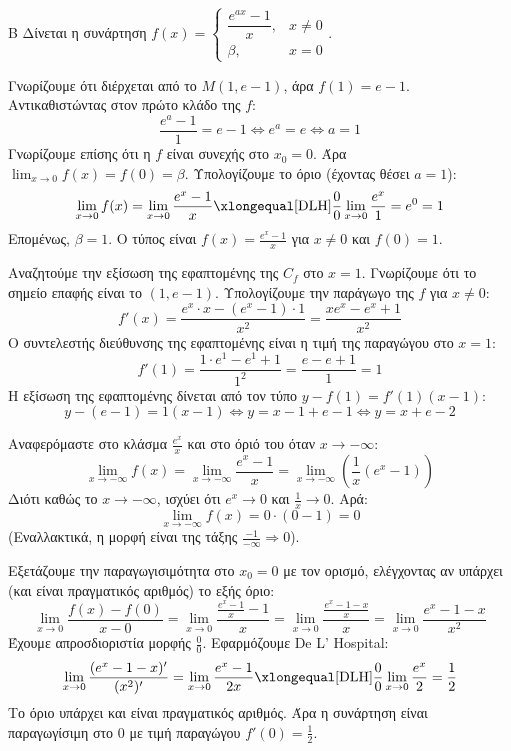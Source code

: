 \begin{thema}{Β}
Δίνεται η συνάρτηση $f(x) = \begin{cases} \dfrac{e^{ax}-1}{x}, & x \ne 0 \\ \beta, & x=0 \end{cases}$.
\begin{erwthma}
\item Γνωρίζουμε ότι διέρχεται από το $M(1, e-1)$, άρα $f(1) = e-1$. Αντικαθιστώντας στον πρώτο κλάδο της $f$:
\[ \frac{e^a - 1}{1} = e - 1 \Leftrightarrow e^a = e \Leftrightarrow a = 1 \]
Γνωρίζουμε επίσης ότι η $f$ είναι συνεχής στο $x_0 = 0$. Άρα $\lim_{x\to0} f(x) = f(0) = \beta$. 
Υπολογίζουμε το όριο (έχοντας θέσει $a=1$):
\[ \lim_{x\to0} f(x) = \lim_{x\to0} \frac{e^x - 1}{x} \xlongequal[\text{DLH}]{\frac{0}{0}} \lim_{x\to0} \frac{e^x}{1} = e^0 = 1 \]
Επομένως, $\beta = 1$. Ο τύπος είναι $f(x) = \frac{e^x-1}{x}$ για $x \ne 0$ και $f(0)=1$.

\item Αναζητούμε την εξίσωση της εφαπτομένης της $C_f$ στο $x=1$. 
Γνωρίζουμε ότι το σημείο επαφής είναι το $(1, e-1)$.
Υπολογίζουμε την παράγωγο της $f$ για $x \ne 0$:
\[ f'(x) = \frac{e^x \cdot x - (e^x-1) \cdot 1}{x^2} = \frac{xe^x - e^x + 1}{x^2} \]
Ο συντελεστής διεύθυνσης της εφαπτομένης είναι η τιμή της παραγώγου στο $x=1$:
\[ f'(1) = \frac{1\cdot e^1 - e^1 + 1}{1^2} = \frac{e - e + 1}{1} = 1 \]
Η εξίσωση της εφαπτομένης δίνεται από τον τύπο $y - f(1) = f'(1)(x - 1)$:
\[ y - (e-1) = 1(x - 1) \Leftrightarrow y = x - 1 + e - 1 \Leftrightarrow y = x + e - 2 \]

\item Αναφερόμαστε στο κλάσμα $\frac{e^x}{x}$ και στο όριό του όταν $x \to -\infty$:
\[ \lim_{x\to-\infty} f(x) = \lim_{x\to-\infty} \frac{e^x - 1}{x} = \lim_{x\to-\infty} \left( \frac{1}{x} (e^x - 1) \right) \]
Διότι καθώς το $x \to -\infty$, ισχύει ότι $e^x \to 0$ και $\frac{1}{x} \to 0$. Αρά:
\[ \lim_{x\to-\infty} f(x) = 0 \cdot (0 - 1) = 0 \]
(Εναλλακτικά, η μορφή είναι της τάξης $\frac{-1}{-\infty} \Rightarrow 0$).

\item Εξετάζουμε την παραγωγισιμότητα στο $x_0=0$ με τον ορισμό, ελέγχοντας αν υπάρχει (και είναι πραγματικός αριθμός) το εξής όριο:
\[ \lim_{x\to0} \frac{f(x) - f(0)}{x - 0} = \lim_{x\to0} \frac{\frac{e^x-1}{x} - 1}{x} = \lim_{x\to0} \frac{\frac{e^x-1-x}{x}}{x} = \lim_{x\to0} \frac{e^x-1-x}{x^2} \]
Έχουμε απροσδιοριστία μορφής $\frac{0}{0}$. Εφαρμόζουμε De L' Hospital:
\[ \lim_{x\to0} \frac{(e^x-1-x)'}{(x^2)'} = \lim_{x\to0} \frac{e^x - 1}{2x} \xlongequal[\text{DLH}]{\frac{0}{0}} \lim_{x\to0} \frac{e^x}{2} = \frac{1}{2} \]
Το όριο υπάρχει και είναι πραγματικός αριθμός. Άρα η συνάρτηση είναι παραγωγίσιμη στο 0 με τιμή παραγώγου $f'(0) = \frac{1}{2}$.
\end{erwthma}
\end{thema}

